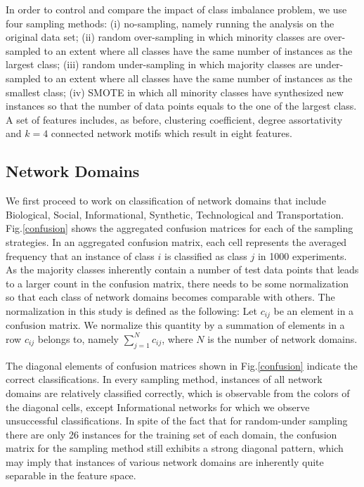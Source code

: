 In order to control and compare the impact of class imbalance problem, we use four sampling methods: (i) no-sampling, namely running the analysis on the original data set; (ii) random over-sampling in which minority classes are over-sampled to an extent where all classes have the same number of instances as the largest class; (iii) random under-sampling in which majority classes are under-sampled to an extent where all classes have the same number of instances as the smallest class; (iv) SMOTE in which all minority classes have synthesized new instances so that the number of data points equals to the one of the largest class. A set of features includes, as before, clustering coefficient, degree assortativity and $k = 4$ connected network motifs which result in eight features.
 
 
\subsection{Network Domains} 
We first proceed to work on classification of network domains that include Biological, Social, Informational, Synthetic, Technological and Transportation. Fig.\ref{confusion} shows the aggregated confusion matrices for each of the sampling strategies. In an aggregated confusion matrix, each cell represents the averaged frequency that an instance of class $i$ is classified as class $j$ in 1000 experiments. As the majority classes inherently contain a number of test data points that leads to a larger count in the confusion matrix, there needs to be some normalization so that each class of network domains becomes comparable with others. The normalization in this study is defined as the following: Let $c_{ij}$ be an element in a confusion matrix. We normalize this quantity by a summation of elements in a row $c_{ij}$ belongs to, namely $\sum_{j=1}^N c_{ij}$, where $N$ is the number of network domains. 

The diagonal elements of confusion matrices shown in Fig.\ref{confusion} indicate the correct classifications. In every sampling method, instances of all network domains are relatively classified correctly, which is observable from the colors of the diagonal cells, except Informational networks for which we observe unsuccessful classifications. In spite of the fact that for random-under sampling there are only 26 instances for the training set of each domain, the confusion matrix for the sampling method still exhibits a strong diagonal pattern, which may imply that instances of various network domains are inherently quite separable in the feature space.

